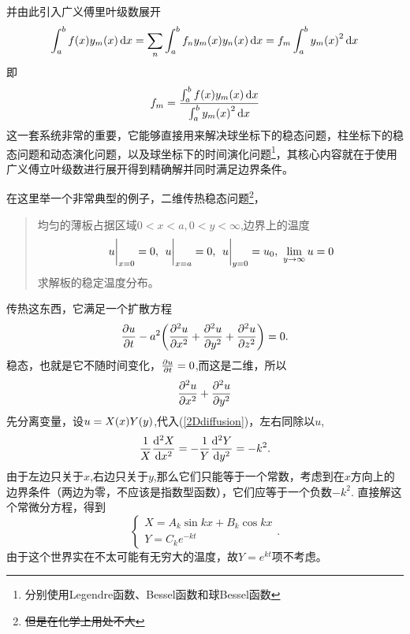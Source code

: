 \documentclass[12pt,a4paper,openany,twoside]{book}
\numberwithin{equation}{section}
\begin{document}
        并由此引入广义傅里叶级数展开
        \begin{equation*}
          \int^b_a{f\qty(x)y_m\qty(x)\dd{x}} =\sum_n{\int^b_a{f_n y_m\qty(x)y_n\qty(x)\dd{x}}}= f_m\int^b_a{y_m\qty(x)^2\dd{x}} 
        \end{equation*} 
        即
        \begin{equation*}
          f_m=\frac{\int^b_a{f\qty(x)y_m\qty(x)\dd{x}}}{\int^b_a{y_m\qty(x)^2\dd{x}}}
        \end{equation*} 
        这一套系统非常的重要，它能够直接用来解决球坐标下的稳态问题，柱坐标下的稳态问题和动态演化问题，以及球坐标下的时间演化问题\footnote{分别使用Legendre函数、Bessel函数和球Bessel函数}，其核心内容就在于使用广义傅立叶级数进行展开得到精确解并同时满足边界条件。

        在这里举一个非常典型的例子，二维传热稳态问题\footnote{\sout{但是在化学上用处不大}}，
        \begin{quote}
          均匀的薄板占据区域$0<x<a,0<y<\infty$,边界上的温度
          \begin{equation*}
            \eval{u}_{x=0}=0,\ \eval{u}_{x=a}=0,\ \eval{u}_{y=0}=u_0,\ \lim_{y\to\infty}u=0
          \end{equation*} 
          求解板的稳定温度分布。
        \end{quote}
        传热这东西，它满足一个扩散方程
        \begin{equation}
          \pdv{u}{t}-a^2\qty(\pdv[2]{u}{x}+\pdv[2]{u}{y}+\pdv[2]{u}{z})=0.
        \end{equation}
        稳态，也就是它不随时间变化，$\pdv{u}{t}=0$,而这是二维，所以
        \begin{equation}
          \pdv[2]{u}{x}+\pdv[2]{u}{y}
          \label{2Ddiffusion}
        \end{equation}
        先分离变量，设$u=X\qty(x)Y\qty(y)$,代入(\ref{2Ddiffusion})，左右同除以$u$,
        \begin{equation}
          \frac{1}{X}\dv[2]{X}{x}=-\frac{1}{Y}\dv[2]{Y}{y}=-k^2.
        \end{equation}
        由于左边只关于$x$,右边只关于$y$,那么它们只能等于一个常数，考虑到在$x$方向上的边界条件（两边为零，不应该是指数型函数），它们应等于一个负数$-k^2$.
        直接解这个常微分方程，得到
        \begin{equation}
          \begin{cases}
            X = A_k\sin{kx} + B_k\cos{kx} \\
            Y = C_k e^{-kt}
          \end{cases}.
        \end{equation}
        由于这个世界实在不太可能有无穷大的温度，故$Y = e^{kt}$项不考虑。
\end{document}

